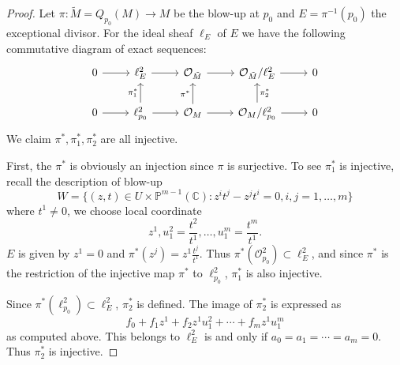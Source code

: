 \documentclass[12pt]{article}
\begin{document}
\begin{proof}
  Let \(\pi\colon \tilde{M}=Q_{p_0}(M)\to M\) be the blow-up at \(p_0\) and
  \(E=\pi^{-1}(p_0)\) the exceptional divisor. For the ideal sheaf \(\ell_E\)
  of \(E\) we have the following commutative diagram of exact sequences:
  \[\begin{tikzcd}
    0 & {\ell_E^2} & {\mathcal{O}_{\tilde{M}}} & {\mathcal{O}_{\tilde{M}}/\ell_E^2} & 0 \\
    0 & {\ell_{p_0}^2} & {\mathcal{O}_M} & {\mathcal{O}_M/\ell_{p_0}^2} & 0
    \arrow[from=1-1, to=1-2]
    \arrow[from=2-1, to=2-2]
    \arrow["{\pi_1^*}", from=2-2, to=1-2]
    \arrow[from=1-2, to=1-3]
    \arrow[from=2-2, to=2-3]
    \arrow["{\pi^*}", from=2-3, to=1-3]
    \arrow[from=2-3, to=2-4]
    \arrow["{\pi_2^*}"', from=2-4, to=1-4]
    \arrow[from=1-3, to=1-4]
    \arrow[from=1-4, to=1-5]
    \arrow[from=2-4, to=2-5]
  \end{tikzcd}\]
  We claim \(\pi^*,\pi_1^*,\pi_2^*\) are all injective.

  First, the \(\pi^*\) is obviously an injection since \(\pi\) is surjective. To
  see \(\pi_1^*\) is injective, recall the description of blow-up \[
    W=\{(z,t)\in U\times \mathbb{P}^{m-1}(\mathbb{C}):z^it^j-z^jt^i=0,
    i,j=1,\ldots,m\}
  \] where \(t^1\neq 0\), we choose local coordinate \[
    z^1,u_1^2=\frac{t^2}{t^1},\ldots,u_1^m=\frac{t^m}{t^1}
  .\] \(E\) is given by \(z^1=0\) and \(\pi^*(z^j)=z^1 \frac{t^j}{t^1}\).
  Thus \(\pi^*(\mathcal{O}_{p_0}^2)\subset \ell_E^2\), and since \(\pi^*\)
  is the restriction of the injective map \(\pi^*\) to \(\ell_{p_0}^2\),
  \(\pi_1^*\) is also injective.

  Since \(\pi^*(\ell_{p_0}^2)\subset \ell_E^2\), \(\pi_2^*\) is defined. The
  image of \(\pi_2^*\) is expressed as \[
    f_0+f_1z^1+f_2z^1u_1^2+\cdots +f_mz^1u_1^m
  \] as computed above. This belongs to \(\ell_E^2\) is and only if 
  \(a_0=a_1=\cdots =a_m=0\). Thus \(\pi_2^*\) is injective.
  

\end{proof}
\end{document}
